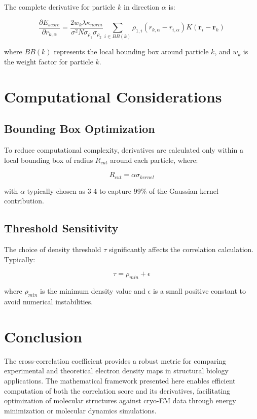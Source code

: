 \documentclass[12pt,a4paper]{article}
\begin{document}
The complete derivative for particle $k$ in direction $\alpha$ is:

\begin{equation}
\frac{\partial E_{score}}{\partial r_{k,\alpha}} = \frac{2 w_k \lambda \kappa_{norm}}{\sigma^2 N \sigma_{\rho_1} \sigma_{\rho_2}} \sum_{i \in BB(k)} \rho_{1,i} (r_{k,\alpha} - r_{i,\alpha}) K(\mathbf{r}_i - \mathbf{r}_k)
\end{equation}

where $BB(k)$ represents the local bounding box around 
particle $k$, and $w_k$ is the weight factor for particle $k$.

\section{Computational Considerations}

\subsection{Bounding Box Optimization}

To reduce computational complexity, derivatives are calculated 
only within a local bounding box of radius $R_{cut}$ around each 
particle, where:

\begin{equation}
R_{cut} = \alpha \sigma_{kernel}
\end{equation}

with $\alpha$ typically chosen as 3-4 to capture 99\% of the 
Gaussian kernel contribution.

\subsection{Threshold Sensitivity}

The choice of density threshold $\tau$ significantly affects 
the correlation calculation. Typically:

\begin{equation}
\tau = \rho_{min} + \epsilon
\end{equation}

where $\rho_{min}$ is the minimum density value and $\epsilon$ is 
a small positive constant to avoid numerical instabilities.

\section{Conclusion}

The cross-correlation coefficient provides a robust metric 
for comparing experimental and theoretical electron density 
maps in structural biology applications. The mathematical 
framework presented here enables efficient computation of 
both the correlation score and its derivatives, facilitating 
optimization of molecular structures against cryo-EM data through 
energy minimization or molecular dynamics simulations.
\end{document}
